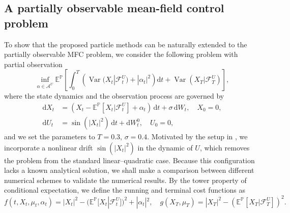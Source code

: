\documentclass[11pt]{article}
\numberwithin{equation}{section}
\theoremstyle{plain}
\theoremstyle{definition}
\theoremstyle{remark}
\newcommand{\dd}{\mathrm{d}}
\DeclareMathOperator{\Var}{Var}
\begin{document}
	\subsection{A partially observable mean-field control problem}
	To show that the proposed particle methods can be naturally extended to the partially observable MFC problem, we consider the following problem with partial observation 
	\begin{equation*}
		\inf_{\alpha \in \mathcal{A}^U} \mathbb{E}^{\mathbb{P}}\left[ \int_0^T \left(\Var(X_t|\mathcal{F}_t^U) + |\alpha_t|^2 \right)\dd t + \Var(X_T|\mathcal{F}_T^U) \right], 
	\end{equation*}
	where the state dynamics and the observation process are governed by 
	\begin{equation*}
		\begin{aligned}
			\dd X_t &= (X_t - \mathbb{E}^\mathbb{P}[X_t|\mathcal{F}_t^U] + \alpha_t)\,\dd t + \sigma \,\dd W_t, \quad X_0 = 0,  \\
			\dd U_t &= \sin(|X_t|^2)\,\dd t + \dd W_t^0, \quad U_0 = 0, 
		\end{aligned}
	\end{equation*}
	and we set the parameters to $T=0.3$, $\sigma = 0.4$. 
	Motivated by the setup in \cite{wan2025discrete}, we incorporate a nonlinear drift $\sin(|X_t|^2)$ in the dynamic of $U$, which removes the problem from the standard linear--quadratic case. Because this configuration lacks a known analytical solution, we shall make a comparison between different numerical schemes to validate the numerical results. By the tower property of conditional expectation, we define the running and terminal cost functions as 
	\begin{equation*}
		f(t,X_t, \mu_t, \alpha_t) = |X_t|^2 - (\mathbb{E}^\mathbb{P}[X_t|\mathcal{F}_t^U])^2 + |\alpha_t|^2, \quad g(X_T, \mu_T) = |X_T|^2 - (\mathbb{E}^{\mathbb{P}}[X_T|\mathcal{F}_T^U])^2. 
	\end{equation*}
	
\end{document}
